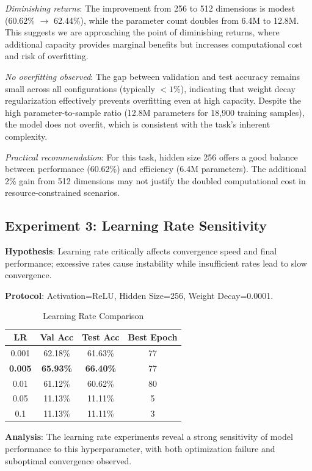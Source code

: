 \documentclass[sigconf,nonacm]{acmart}
\begin{document}
\textit{Diminishing returns}: The improvement from 256 to 512 dimensions is modest (60.62\% $\rightarrow$ 62.44\%), while the parameter count doubles from 6.4M to 12.8M. This suggests we are approaching the point of diminishing returns, where additional capacity provides marginal benefits but increases computational cost and risk of overfitting.

\textit{No overfitting observed}: The gap between validation and test accuracy remains small across all configurations (typically $<1\%$), indicating that weight decay regularization effectively prevents overfitting even at high capacity. Despite the high parameter-to-sample ratio (12.8M parameters for 18,900 training samples), the model does not overfit, which is consistent with the task's inherent complexity.

\textit{Practical recommendation}: For this task, hidden size 256 offers a good balance between performance (60.62\%) and efficiency (6.4M parameters). The additional 2\% gain from 512 dimensions may not justify the doubled computational cost in resource-constrained scenarios.

\subsection{Experiment 3: Learning Rate Sensitivity}

\textbf{Hypothesis}: Learning rate critically affects convergence speed and final performance; excessive rates cause instability while insufficient rates lead to slow convergence.

\textbf{Protocol}: Activation=ReLU, Hidden Size=256, Weight Decay=0.0001.

\begin{table}[htbp]
\caption{Learning Rate Comparison}
\label{tab:lr}
\centering
\small
\begin{tabular}{cccc}
\toprule
LR & Val Acc & Test Acc & Best Epoch \\
\midrule
0.001 & 62.18\% & 61.63\% & 77 \\
\textbf{0.005} & \textbf{65.93\%} & \textbf{66.40\%} & 77 \\
0.01 & 61.12\% & 60.62\% & 80 \\
0.05 & 11.13\% & 11.11\% & 5 \\
0.1 & 11.13\% & 11.11\% & 3 \\
\bottomrule
\end{tabular}
\end{table}

\textbf{Analysis}: The learning rate experiments reveal a strong sensitivity of model performance to this hyperparameter, with both optimization failure and suboptimal convergence observed.
\end{document}
